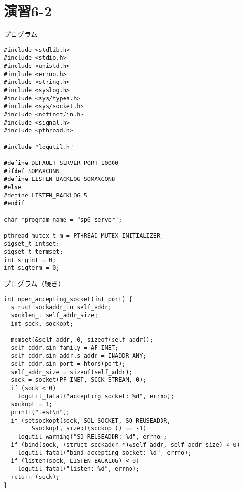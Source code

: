 \documentclass[10pt]{jarticle}
\begin{document}
\section{演習6-2}

\begin{itembox}[l]{プログラム}
  \begin{verbatim}
#include <stdlib.h>
#include <stdio.h>
#include <unistd.h>
#include <errno.h>
#include <string.h>
#include <syslog.h>
#include <sys/types.h>
#include <sys/socket.h>
#include <netinet/in.h>
#include <signal.h>
#include <pthread.h>

#include "logutil.h"

#define DEFAULT_SERVER_PORT	10000
#ifdef SOMAXCONN
#define LISTEN_BACKLOG SOMAXCONN
#else
#define LISTEN_BACKLOG 5
#endif

char *program_name = "sp6-server";

pthread_mutex_t m = PTHREAD_MUTEX_INITIALIZER;
sigset_t intset;
sigset_t termset;
int sigint = 0;
int sigterm = 0;
  \end{verbatim}
\end{itembox}

\begin{itembox}[l]{プログラム（続き）}
  \begin{verbatim}
int open_accepting_socket(int port) {
  struct sockaddr_in self_addr;
  socklen_t self_addr_size;
  int sock, sockopt;

  memset(&self_addr, 0, sizeof(self_addr));
  self_addr.sin_family = AF_INET;
  self_addr.sin_addr.s_addr = INADDR_ANY;
  self_addr.sin_port = htons(port);
  self_addr_size = sizeof(self_addr);
  sock = socket(PF_INET, SOCK_STREAM, 0);
  if (sock < 0)
    logutil_fatal("accepting socket: %d", errno);
  sockopt = 1;
  printf("test\n");
  if (setsockopt(sock, SOL_SOCKET, SO_REUSEADDR,
        &sockopt, sizeof(sockopt)) == -1)
    logutil_warning("SO_REUSEADDR: %d", errno);
  if (bind(sock, (struct sockaddr *)&self_addr, self_addr_size) < 0)
    logutil_fatal("bind accepting socket: %d", errno);
  if (listen(sock, LISTEN_BACKLOG) < 0)
    logutil_fatal("listen: %d", errno);
  return (sock);
}
  \end{verbatim}
\end{itembox}
\end{document}
